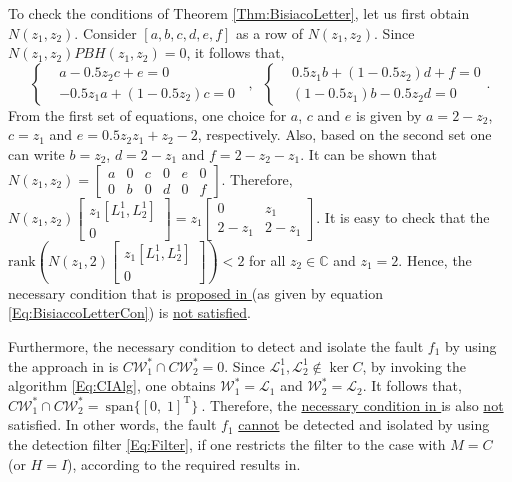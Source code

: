 \documentclass[journal,12pt,draftcls,onecolumn]{IEEEtran}
\newcommand{\tran}{\mathrm{T}}
\newcommand{\bbm}{\begin{bmatrix}}
\newcommand{\ebm}{\end{bmatrix}}
\newcommand{\rank}{\mathrm{rank}}
\newcommand{\ssp}[1]{\mathscr{#1}}      \newcommand{\setssp}[1]{\mathfrak{#1}}   \newcommand{\fld}[1]{\mathbb{#1}}       \newcommand{\op}[1]{\mathcal{#1}}       \newcommand{\sumbanach}[1]{\sum{#1}}
\newcommand{\spanset}[1]{\ \mathrm{span}\{#1\}\ } \newcommand{\idv}{{\bf x}_{-\infty}^\infty}				\newcommand{\fdv}{{\bf x}}
\begin{document}
To check the conditions of Theorem \ref{Thm:BisiacoLetter}, let us first obtain $N(z_1,z_2)$. Consider $[a,b,c,d,e,f]$ as a row of $N(z_1,z_2)$. Since $N(z_1,z_2)PBH(z_1,z_2)=0$, it follows that,
\begin{equation}
	\left\{\begin{split}
		&a-0.5z_2c+e =0\\
		&-0.5z_1a+(1-0.5z_2)c = 0
	\end{split}\right.\;\;,\;\; \left\{\begin{split}
	&0.5z_1b+(1-0.5z_2)d + f =0\\
	&(1-0.5z_1)b-0.5z_2d = 0
\end{split}\right..
\end{equation}
From the first set of equations, one choice for $a$, $c$ and $e$ is given by $a= 2-z_2$, $c=z_1$ and $e = 0.5z_2z_1+z_2-2$, respectively. Also, based on the second set one can write $b=z_2$, $d=2-z_1$ and $f=2-z_2-z_1$. It can be shown that $N(z_1,z_2)=\bbm a &0 &c &0 &e &0\\ 0 &b &0 &d &0 &f\ebm$. Therefore, $N(z_1,z_2)\bbm z_1[L^1_1,L^1_2]\\
0\ebm= z_1\bbm 0 &z_1\\ 2-z_1 &2-z_1\ebm$. It is easy to check that the $\rank(N(z_1,2)\bbm z_1[L^1_1,L^1_2]\\
0\ebm)<2$ for all $z_2\in\fld{C}$ and $z_1 = 2$. Hence, the necessary condition that is \underline{proposed in \cite{BisiaccoLetter}} (as given by equation \eqref{Eq:BisiaccoLetterCon}) is \underline{not satisfied}.

Furthermore, the necessary condition to detect and isolate the fault $f_1$ by using the approach in \cite{Malek_3DFDI} is $C\ssp{W}_1^*\cap C\ssp{W}_2^*=0$. Since $\ssp{L}_1^1,\ssp{L}_2^1\not\in\ker C$, by invoking the algorithm \eqref{Eq:CIAlg}, one obtains $\ssp{W}_{1}^*=\ssp{L}_1$ and $\ssp{W}_{2}^*=\ssp{L}_2$. It follows that, $C\ssp{W}_{1}^*\cap C\ssp{W}_{2}^* =\spanset{[0,\;1]^\tran}$. Therefore, the \underline{necessary condition in \cite{Malek_3DFDI}} is also \underline{not} satisfied. In other words, the fault $f_1$ \underline{cannot} be detected and isolated by using the detection filter \eqref{Eq:Filter}, if one restricts the filter to the case with $M=C$ (or $H=I$),  according to the required results in\cite{Malek_3DFDI}.
\end{document}
